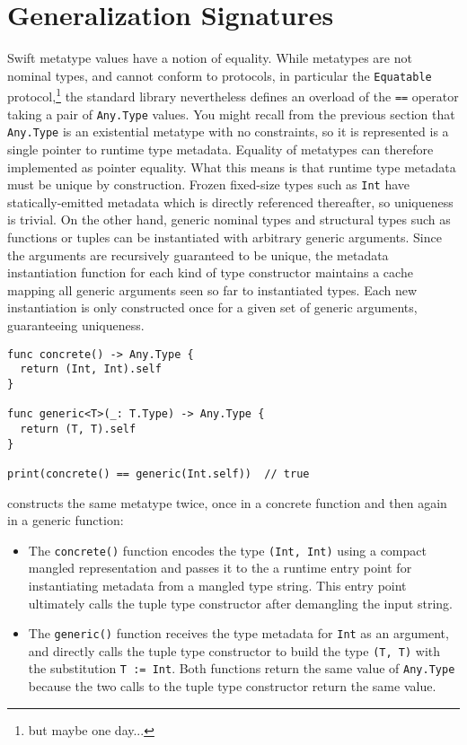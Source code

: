 \documentclass[../generics]{subfiles}
\begin{document}
\section[]{Generalization Signatures}

Swift metatype values have a notion of equality. While metatypes are not nominal types, and cannot conform to protocols, in particular the \texttt{Equatable} protocol,\footnote{but maybe one day...} the standard library nevertheless defines an overload of the \texttt{==} operator taking a pair of \texttt{Any.Type} values. You might recall from the previous section that \texttt{Any.Type} is an existential metatype with no constraints, so it is represented is a single pointer to runtime type metadata. Equality of metatypes can therefore implemented as pointer equality. What this means is that runtime type metadata must be unique by construction. Frozen fixed-size types such as \texttt{Int} have statically-emitted metadata which is directly referenced thereafter, so uniqueness is trivial. On the other hand, generic nominal types and structural types such as functions or tuples can be instantiated with arbitrary generic arguments. Since the arguments are recursively guaranteed to be unique, the metadata instantiation function for each kind of type constructor maintains a cache mapping all generic arguments seen so far to instantiated types. Each new instantiation is only constructed once for a given set of generic arguments, guaranteeing uniqueness.

\begin{listing}\label{metadataunique}
\begin{Verbatim}
func concrete() -> Any.Type {
  return (Int, Int).self
}

func generic<T>(_: T.Type) -> Any.Type {
  return (T, T).self
}

print(concrete() == generic(Int.self))  // true
\end{Verbatim}
\end{listing}
 constructs the same metatype twice, once in a concrete function and then again in a generic function:
\begin{itemize}
\item The \texttt{concrete()} function encodes the type \texttt{(Int, Int)} using a compact mangled representation and passes it to the a runtime entry point for instantiating metadata from a mangled type string. This entry point ultimately calls the tuple type constructor after demangling the input string.
\item The \texttt{generic()} function receives the type metadata for \texttt{Int} as an argument, and directly calls the tuple type constructor to build the type \texttt{(T, T)} with the substitution \texttt{T := Int}. Both functions return the same value of \texttt{Any.Type} because the two calls to the tuple type constructor return the same value.
\end{itemize}
\end{document}
